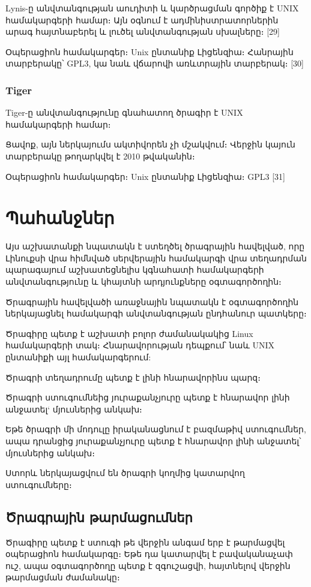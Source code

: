 \documentclass[10pt]{article}
\begin{document}
\begin{sloppypar}
Lynis-ը անվտանգության աուդիտի և կարծրացման գործիք է UNIX համակարգերի համար։
Այն օգնում է ադմինիստրատորներին արագ հայտնաբերել և լուծել
անվտանգության սխալները։
[29]

Օպերացիոն համակարգեր։ Unix ընտանիք
Լիցենզիա։ Հանրային տարբերակը՝ GPL3, կա նաև վճարովի առևտրային տարբերակ։
[30]


\subsubsection{Tiger}


Tiger-ը անվտանգությունը գնահատող ծրագիր է UNIX համակարգերի համար։

Ցավոք, այն ներկայումս ակտիվորեն չի մշակվում։ Վերջին կայուն տարբերակը
թողարկվել է 2010 թվականին։

Օպերացիոն համակարգեր։ Unix ընտանիք
Լիցենզիա։ GPL3
[31]


\section{Պահանջներ}


Այս աշխատանքի նպատակն է ստեղծել ծրագրային հավելված, որը Լինուքսի
վրա հիմնված սերվերային համակարգի վրա տեղադրման պարագայում
աշխատեցնելիս կգնահատի համակարգերի անվտանգությունը և կհայտնի
արդյունքները օգտագործողին։

Ծրագրային հավելվածի առաջնային նպատակն է օգտագործողին ներկայացնել
համակարգի անվտանգության ընդհանուր պատկերը։

Ծրագիրը պետք է աշխատի բոլոր ժամանակակից Linux համակարգերի տակ։
Հնարավորության դեպքում՝ նաև UNIX ընտանիքի այլ համակարգերում:

Ծրագրի տեղադրումը պետք է լինի հնարավորինս պարզ։

Ծրագրի ստուգումնեից յուրաքանչյուրը պետք է հնարավոր լինի անջատել`
մյուսներից անկախ։

Եթե ծրագրի մի մոդուլը իրականացնում է բազմաթիվ ստուգումներ,
ապա դրանցից յուրաքանչյուրը պետք է հնարավոր լինի անջատել՝
մյուսներից անկախ։

Ստորև ներկայացվում են ծրագրի կողմից կատարվող ստուգումները։


\subsection{Ծրագրային թարմացումներ}

Ծրագիրը պետք է ստուգի թե վերջին անգամ երբ է թարմացվել
օպերացիոն համակարգը։
Եթե դա կատարվել է բավականաչափ ուշ, ապա օգտագործողը պետք է
զգուշացվի, հայտնելով վերջին թարմացման ժամանակը։


\end{sloppypar}
\end{document}
